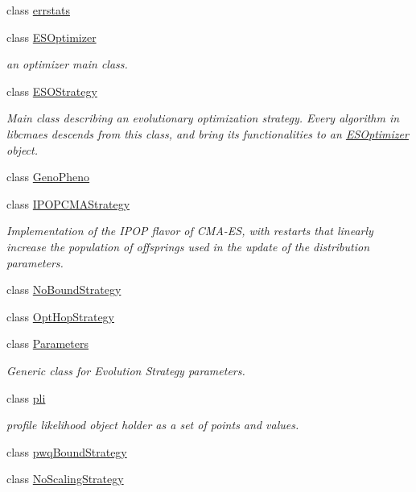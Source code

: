 \begin{DoxyCompactItemize}
class \hyperlink{classlibcmaes_1_1errstats}{errstats}
\item 
class \hyperlink{classlibcmaes_1_1ESOptimizer}{E\-S\-Optimizer}
\begin{DoxyCompactList}\small\item\em an optimizer main class. \end{DoxyCompactList}\item 
class \hyperlink{classlibcmaes_1_1ESOStrategy}{E\-S\-O\-Strategy}
\begin{DoxyCompactList}\small\item\em Main class describing an evolutionary optimization strategy. Every algorithm in libcmaes descends from this class, and bring its functionalities to an \hyperlink{classlibcmaes_1_1ESOptimizer}{E\-S\-Optimizer} object. \end{DoxyCompactList}\item 
class \hyperlink{classlibcmaes_1_1GenoPheno}{Geno\-Pheno}
\item 
class \hyperlink{classlibcmaes_1_1IPOPCMAStrategy}{I\-P\-O\-P\-C\-M\-A\-Strategy}
\begin{DoxyCompactList}\small\item\em Implementation of the I\-P\-O\-P flavor of C\-M\-A-\/\-E\-S, with restarts that linearly increase the population of offsprings used in the update of the distribution parameters. \end{DoxyCompactList}\item 
class \hyperlink{classlibcmaes_1_1NoBoundStrategy}{No\-Bound\-Strategy}
\item 
class \hyperlink{classlibcmaes_1_1OptHopStrategy}{Opt\-Hop\-Strategy}
\item 
class \hyperlink{classlibcmaes_1_1Parameters}{Parameters}
\begin{DoxyCompactList}\small\item\em Generic class for Evolution Strategy parameters. \end{DoxyCompactList}\item 
class \hyperlink{classlibcmaes_1_1pli}{pli}
\begin{DoxyCompactList}\small\item\em profile likelihood object holder as a set of points and values. \end{DoxyCompactList}\item 
class \hyperlink{classlibcmaes_1_1pwqBoundStrategy}{pwq\-Bound\-Strategy}
\item 
class \hyperlink{classlibcmaes_1_1NoScalingStrategy}{No\-Scaling\-Strategy}

\end{DoxyCompactItemize}
